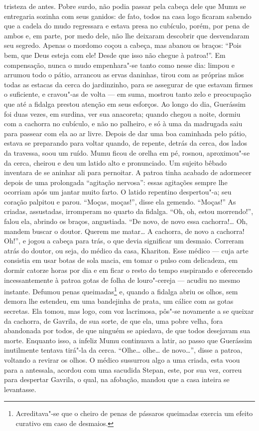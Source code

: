 tristeza de antes. Pobre surdo, não podia passar pela cabeça dele que
Mumu se entregaria sozinha com seus ganidos: de fato, todos na casa logo
ficaram sabendo que a cadela do mudo regressara e estava presa no
cubículo, porém, por pena de ambos e, em parte, por medo dele, não lhe
deixaram descobrir que desvendaram seu segredo. Apenas o mordomo coçou a
cabeça, mas abanou os braços: ``Pois bem, que Deus esteja com ele! Desde
que isso não chegue à patroa!''. Em compensação, nunca o mudo
empenhara"-se tanto como nesse dia: limpou e arrumou todo o pátio,
arrancou as ervas daninhas, tirou com as próprias mãos todas as estacas
da cerca do jardinzinho, para se assegurar de que estavam firmes o
suficiente, e cravou"-as de volta --- em suma, mostrou tanto zelo e
preocupação que até a fidalga prestou atenção em seus esforços. Ao longo
do dia, Guerássim foi duas vezes, em surdina, ver sua anacoreta; quando
chegou a noite, dormiu com a cachorra no cubículo, e não no palheiro, e
só à uma da madrugada saiu para passear com ela ao ar livre. Depois de
dar uma boa caminhada pelo pátio, estava se preparando para
voltar quando, de repente, detrás da cerca, dos lados da travessa, soou
um ruído. Mumu ficou de orelha em pé, rosnou, aproximou"-se da cerca,
cheirou e deu um latido alto e pronunciado. Um sujeito bêbado inventara
de se aninhar ali para pernoitar. A patroa tinha acabado de adormecer
depois de uma prolongada ``agitação nervosa'': essas agitações sempre
lhe ocorriam após um jantar muito farto. O latido repentino despertou"-a;
seu coração palpitou e parou. ``Moças, moças!'', disse ela gemendo.
``Moças!'' As criadas, assustadas, irromperam no quarto da fidalga.
``Oh, oh, estou morrendo!'', falou ela, abrindo os braços, angustiada.
``De novo, de novo essa cachorra!\ldots{} Oh, mandem buscar o doutor. Querem
me matar\ldots{} A cachorra, de novo a cachorra! Oh!'', e jogou a cabeça para
trás, o que devia significar um desmaio. Correram atrás do doutor, ou
seja, do médico da casa, Khariton. Esse médico --- cuja arte consistia
em usar botas de sola macia, em tomar o pulso com delicadeza, em dormir
catorze horas por dia e em ficar o resto do tempo suspirando e
oferecendo incessantemente à patroa gotas de folha de louro"-cereja ---
acudiu no mesmo instante. Defumou penas queimadas\footnote{Acreditava"-se
  que o cheiro de penas de pássaros queimadas exercia um efeito curativo
  em caso de desmaios.} e, quando a fidalga abriu os olhos, sem demora
lhe estendeu, em uma bandejinha de prata, um cálice com as gotas
secretas. Ela tomou, mas logo, com voz lacrimosa, pôs"-se
novamente a se queixar da cachorra, de Gavrila, de sua sorte, de que
ela, uma pobre velha, fora abandonada por todos, de que ninguém se
apiedava, de que todos desejavam sua morte. Enquanto isso, a infeliz
Mumu continuava a latir, ao passo que Guerássim inutilmente tentava tirá"-la
da cerca. ``Olhe\ldots{} olhe\ldots{} de novo\ldots{}'', disse a patroa, voltando a
revirar os olhos. O médico sussurrou algo a uma criada, esta voou para a
antessala, acordou com uma sacudida Stepan, este, por sua vez, correu
para despertar Gavrila, o qual, na afobação, mandou que a casa inteira se
levantasse.

